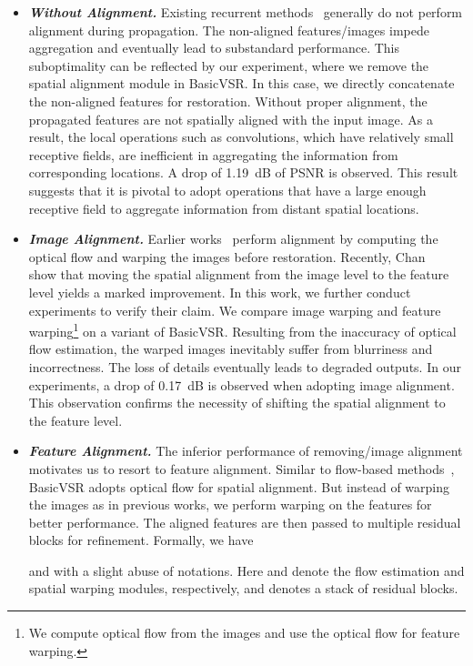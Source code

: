 \documentclass[final]{cvpr}
\begin{document}
\begin{itemize}
	\item \textit{\textbf{Without Alignment.}}
	      Existing recurrent methods~\cite{fuoli2019efficient,huang2015bidirectional,huang2018video,isobe2020video1,isobe2020revisiting} generally do not perform alignment during propagation. The non-aligned features/images impede aggregation and eventually lead to substandard performance. This suboptimality can be reflected by our experiment, where we remove the spatial alignment module in BasicVSR. In this case, we directly concatenate the non-aligned features for restoration. Without proper alignment, the propagated features are not spatially aligned with the input image. As a result, the local operations such as convolutions, which have relatively small receptive fields, are inefficient in aggregating the information from corresponding locations. A drop of 1.19~dB of PSNR is observed. This result suggests that it is pivotal to adopt operations that have a large enough receptive field to aggregate information from distant spatial locations.
	\item \textit{\textbf{Image Alignment.}}
	      Earlier works~\cite{kim2018spatio,xue2019video} perform alignment by computing the optical flow and warping the images before restoration. Recently, Chan~\etal~\cite{chan2020understanding} show that moving the spatial alignment from the image level to the feature level yields a marked improvement. In this work, we further conduct experiments to verify their claim. We compare image warping and feature warping\footnote{We compute optical flow from the images and use the optical flow for feature warping.} on a variant of BasicVSR. Resulting from the inaccuracy of optical flow estimation, the warped images inevitably suffer from blurriness and incorrectness. The loss of details eventually leads to degraded outputs. In our experiments, a drop of 0.17~dB is observed when adopting image alignment. This observation confirms the necessity of shifting the spatial alignment to the feature level.
	\item \textit{\textbf{Feature Alignment.}}
	      The inferior performance of removing/image alignment motivates us to resort to feature alignment. Similar to flow-based methods~\cite{kim2018spatio,sajjadi2018frame,xue2019video}, BasicVSR adopts optical flow for spatial alignment. But instead of warping the images as in previous works, we perform warping on the features for better performance. The aligned features are then passed to multiple residual blocks for refinement.
Formally, we have
	      
	      and  with a slight abuse of notations. Here  and  denote the flow estimation and spatial warping modules, respectively, and  denotes a stack of residual blocks.
\end{itemize}
\end{document}
